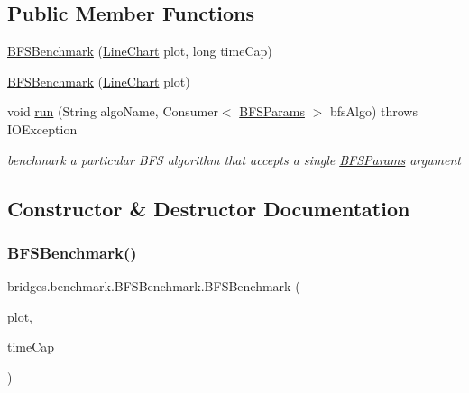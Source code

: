 \subsection*{Public Member Functions}
\begin{DoxyCompactItemize}
\item 
\mbox{\hyperlink{classbridges_1_1benchmark_1_1_b_f_s_benchmark_a47647a605d5cd6523e1472191e12ab94}{B\+F\+S\+Benchmark}} (\mbox{\hyperlink{classbridges_1_1base_1_1_line_chart}{Line\+Chart}} plot, long time\+Cap)
\item 
\mbox{\hyperlink{classbridges_1_1benchmark_1_1_b_f_s_benchmark_afe4a4dd46295e41c1cb7ee25c616a2c9}{B\+F\+S\+Benchmark}} (\mbox{\hyperlink{classbridges_1_1base_1_1_line_chart}{Line\+Chart}} plot)
\item 
void \mbox{\hyperlink{classbridges_1_1benchmark_1_1_b_f_s_benchmark_a0f530ad46a8a379b86285e0efcf8d51c}{run}} (String algo\+Name, Consumer$<$ \mbox{\hyperlink{classbridges_1_1benchmark_1_1_b_f_s_params}{B\+F\+S\+Params}} $>$ bfs\+Algo)  throws I\+O\+Exception 
\begin{DoxyCompactList}\small\item\em benchmark a particular B\+FS algorithm that accepts a single \mbox{\hyperlink{classbridges_1_1benchmark_1_1_b_f_s_params}{B\+F\+S\+Params}} argument \end{DoxyCompactList}\end{DoxyCompactItemize}


\subsection{Constructor \& Destructor Documentation}
\mbox{\label{classbridges_1_1benchmark_1_1_b_f_s_benchmark_a47647a605d5cd6523e1472191e12ab94}} 
\subsubsection{\texorpdfstring{B\+F\+S\+Benchmark()}{BFSBenchmark()}\hspace{0.1cm}{\footnotesize\ttfamily [1/2]}}
{\footnotesize\ttfamily bridges.\+benchmark.\+B\+F\+S\+Benchmark.\+B\+F\+S\+Benchmark (\begin{DoxyParamCaption}\item[{\mbox{\hyperlink{classbridges_1_1base_1_1_line_chart}{Line\+Chart}}}]{plot,  }\item[{long}]{time\+Cap }\end{DoxyParamCaption})}

